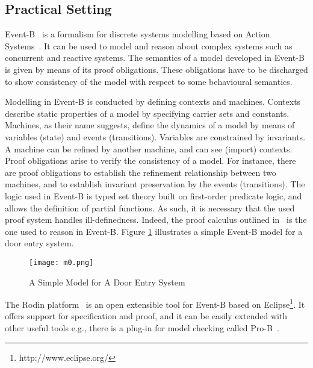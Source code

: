 \documentclass[copyright]{eptcs}
\begin{document}
\subsection{Practical Setting}\label{pracSetting}
Event-B~\cite{1365974} is a formalism for discrete systems modelling based on Action Systems~\cite{91938}. It can be used to model and reason about complex systems such as concurrent and reactive systems. The semantics of a model developed in Event-B is given by means of its proof obligations. These obligations have to be discharged to show consistency of the model with respect to some behavioural semantics.
\par
Modelling in Event-B is conducted by defining contexts and machines. Contexts describe static properties of a model by specifying carrier sets and constants. Machines, as their name suggests, define the dynamics of a model by means of variables (state) and events (transitions). Variables are constrained by invariants. A machine can be refined by another machine, and can see (import) contexts. Proof obligations arise to verify the consistency of a model. For instance, there are proof obligations to establish the refinement relationship between two machines, and to establish invariant preservation by the events (transitions). The logic used in Event-B is typed set theory built on first-order predicate logic, and allows the definition of partial functions. As such, it is necessary that the used proof system handles ill-definedness. Indeed, the proof calculus outlined in~\cite{icfemMehta08} is the one used to reason in Event-B. Figure \ref{simpleModel} illustrates a simple Event-B model for a door entry system.
\begin{figure}[tbp]
\texttt{[image: m0.png]}
\caption{A Simple Model for A Door Entry System}\label{simpleModel}
\end{figure}
\par
The Rodin platform~\cite{Abrial-etal06} is an open extensible tool for Event-B based on Eclipse\footnote{http://www.eclipse.org/}. It offers support
for specification and proof, and it can be easily extended with other useful tools e.g., there is a plug-in for model checking called Pro-B~\cite{LeuschelButler:FME03}.
\end{document}
